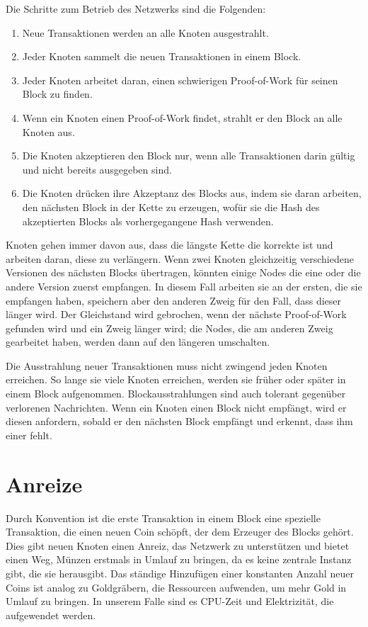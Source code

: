 \documentclass[10pt]{article}
\begin{document}
	Die Schritte zum Betrieb des Netzwerks sind die Folgenden:
	
	\begin{enumerate}[label={\arabic*)}, topsep=0pt, itemsep=-1ex, partopsep=1ex, parsep=1ex]
		\item Neue Transaktionen werden an alle Knoten ausgestrahlt.
		\item Jeder Knoten sammelt die neuen Transaktionen in einem Block.
		\item Jeder Knoten arbeitet daran, einen schwierigen Proof-of-Work für seinen Block zu finden.
		\item Wenn ein Knoten einen Proof-of-Work findet, strahlt er den Block an alle Knoten aus.
		\item Die Knoten akzeptieren den Block nur, wenn alle Transaktionen darin gültig und nicht bereits ausgegeben sind.
		\item Die Knoten drücken ihre Akzeptanz des Blocks aus, indem sie daran arbeiten, den nächsten Block in der Kette zu erzeugen, wofür sie die Hash des akzeptierten Blocks als vorhergegangene Hash verwenden.
	\end{enumerate}
	
	Knoten gehen immer davon aus, dass die längste Kette die korrekte ist und arbeiten daran, diese zu verlängern. Wenn zwei Knoten gleichzeitig verschiedene Versionen des nächsten Blocks übertragen, könnten einige Nodes die eine oder die andere Version zuerst empfangen. In diesem Fall arbeiten sie an der ersten, die sie empfangen haben, speichern aber den anderen Zweig für den Fall, dass dieser länger wird. Der Gleichstand wird gebrochen, wenn der nächste Proof-of-Work gefunden wird und ein Zweig länger wird; die Nodes, die am anderen Zweig gearbeitet haben, werden dann auf den längeren umschalten.

	\newpage
	
	Die Ausstrahlung neuer Transaktionen muss nicht zwingend jeden Knoten erreichen. So lange sie viele Knoten erreichen, werden sie früher oder später in einem Block aufgenommen. Blockausstrahlungen sind auch tolerant gegenüber verlorenen Nachrichten. Wenn ein Knoten einen Block nicht empfängt, wird er diesen anfordern, sobald er den nächsten Block empfängt und erkennt, dass ihm einer fehlt.
	
	\section{Anreize}
	
	Durch Konvention ist die erste Transaktion in einem Block eine spezielle Transaktion, die einen neuen Coin schöpft, der dem Erzeuger des Blocks gehört. Dies gibt neuen Knoten einen Anreiz, das Netzwerk zu unterstützen und bietet einen Weg, Münzen erstmals in Umlauf zu bringen, da es keine zentrale Instanz gibt, die sie herausgibt. Das ständige Hinzufügen einer konstanten Anzahl neuer Coins ist analog zu Goldgräbern, die Ressourcen aufwenden, um mehr Gold in Umlauf zu bringen. In unserem Falle sind es CPU-Zeit und Elektrizität, die aufgewendet werden.
\end{document}
